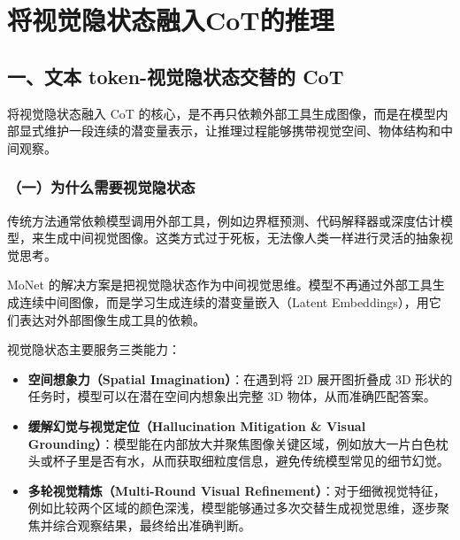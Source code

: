\clearpage

\hypertarget{ux5c06ux89c6ux89c9ux9690ux72b6ux6001ux878dux5165cotux7684ux63a8ux7406}{%
\section{将视觉隐状态融入CoT的推理}\label{ux5c06ux89c6ux89c9ux9690ux72b6ux6001ux878dux5165cotux7684ux63a8ux7406}}

\hypertarget{ux4e00ux6587ux672c-token-ux89c6ux89c9ux9690ux72b6ux6001ux4ea4ux66ffux7684-cot}{%
\subsection{一、文本 token-视觉隐状态交替的 CoT}\label{ux4e00ux6587ux672c-token-ux89c6ux89c9ux9690ux72b6ux6001ux4ea4ux66ffux7684-cot}}

将视觉隐状态融入 CoT 的核心，是不再只依赖外部工具生成图像，而是在模型内部显式维护一段连续的潜变量表示，让推理过程能够携带视觉空间、物体结构和中间观察。

\hypertarget{ux4e00ux4e3aux4ec0ux4e48ux9700ux8981ux89c6ux89c9ux9690ux72b6ux6001}{%
\subsubsection{（一）为什么需要视觉隐状态}\label{ux4e00ux4e3aux4ec0ux4e48ux9700ux8981ux89c6ux89c9ux9690ux72b6ux6001}}

传统方法通常依赖模型调用外部工具，例如边界框预测、代码解释器或深度估计模型，来生成中间视觉图像。这类方式过于死板，无法像人类一样进行灵活的抽象视觉思考。

MoNet 的解决方案是把视觉隐状态作为中间视觉思维。模型不再通过外部工具生成连续中间图像，而是学习生成连续的潜变量嵌入（Latent Embeddings），用它们表达对外部图像生成工具的依赖。

视觉隐状态主要服务三类能力：

\begin{itemize}
\tightlist
\item
  \textbf{空间想象力（Spatial Imagination）}：在遇到将 2D 展开图折叠成 3D 形状的任务时，模型可以在潜在空间内想象出完整 3D 物体，从而准确匹配答案。
\item
  \textbf{缓解幻觉与视觉定位（Hallucination Mitigation \& Visual Grounding）}：模型能在内部放大并聚焦图像关键区域，例如放大一片白色枕头或杯子里是否有水，从而获取细粒度信息，避免传统模型常见的细节幻觉。
\item
  \textbf{多轮视觉精炼（Multi-Round Visual Refinement）}：对于细微视觉特征，例如比较两个区域的颜色深浅，模型能够通过多次交替生成视觉思维，逐步聚焦并综合观察结果，最终给出准确判断。
\end{itemize}


